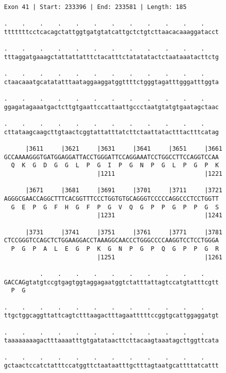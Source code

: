 \documentclass{article}
\begin{document}
\begin{Verbatim}[fontfamily=courier]
Exon 41 | Start: 233396 | End: 233581 | Length: 185

.    .    .    .    .    .    .    .    .    .    .    .    
tttttttcctcacagctattggtgatgtatcattgctctgtcttaacacaaaggatacct

.    .    .    .    .    .    .    .    .    .    .    .    
tttaggatgaaagctattattatttctacatttctatatatactctaataaatacttctg

.    .    .    .    .    .    .    .    .    .    .    .    
ctaacaaatgcatatatttaataggaaggatggttttctgggtagatttgggatttggta

.    .    .    .    .    .    .    .    .    .    .    .    
ggagatagaaatgactcttgtgaattccattaattgccctaatgtatgtgaatagctaac

.    .    .    .    .    .    .    .    .    .    .    .    
cttataagcaagcttgtaactcggtattatttatcttctaattatactttactttcatag

      |3611     |3621     |3631     |3641     |3651     |3661
GCCAAAAGGGTGATGGAGGATTACCTGGGATTCCAGGAAATCCTGGCCTTCCAGGTCCAA
  Q  K  G  D  G  G  L  P  G  I  P  G  N  P  G  L  P  G  P  K
                          |1211                         |1221

      |3671     |3681     |3691     |3701     |3711     |3721
AGGGCGAACCAGGCTTTCACGGTTTCCCTGGTGTGCAGGGTCCCCCAGGCCCTCCTGGTT
  G  E  P  G  F  H  G  F  P  G  V  Q  G  P  P  G  P  P  G  S
                          |1231                         |1241

      |3731     |3741     |3751     |3761     |3771     |3781
CTCCGGGTCCAGCTCTGGAAGGACCTAAAGGCAACCCTGGGCCCCAAGGTCCTCCTGGGA
  P  G  P  A  L  E  G  P  K  G  N  P  G  P  Q  G  P  P  G  R
                          |1251                         |1261

          .    .    .    .    .    .    .    .    .    .    
GACCAGgtatgtccgtgagtggtaggagaatggtctatttattagtccatgtatttcgtt
  P  G                                                      

.    .    .    .    .    .    .    .    .    .    .    .    
ttgctggcaggttattcagtctttaagactttagaatttttccggtgcattggaggatgt

.    .    .    .    .    .    .    .    .    .    .    .    
taaaaaaaagactttaaaatttgtgatataacttcttacaagtaaatagcttggttcata

.    .    .    .    .    .    .    .    .    .    .    .    
gctaactccatctatttccatggttctaataatttgctttagtaatgcattttatcattt

\end{Verbatim}
\end{document}
